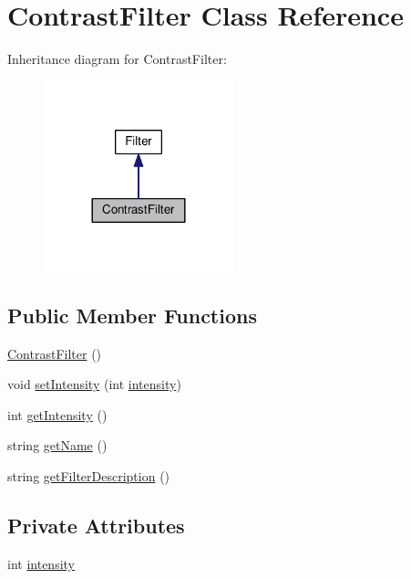 \hypertarget{classModel_1_1ContrastFilter}{}\section{Contrast\+Filter Class Reference}
\label{classModel_1_1ContrastFilter}


Inheritance diagram for Contrast\+Filter\+:
\nopagebreak
\begin{figure}[H]
\begin{center}
\leavevmode
\includegraphics[width=156pt]{classModel_1_1ContrastFilter__inherit__graph}
\end{center}
\end{figure}
\subsection*{Public Member Functions}
\begin{DoxyCompactItemize}
\item 
\hyperlink{classModel_1_1ContrastFilter_abc944002d3dce00b176a4133c05f7c9c}{Contrast\+Filter} ()
\item 
void \hyperlink{classModel_1_1ContrastFilter_ac8255ffbc46bb61acaa8fd23d0d260eb}{set\+Intensity} (int \hyperlink{classModel_1_1ContrastFilter_a299ec0c42ccc5a2d79d1739428ac3210}{intensity})
\item 
int \hyperlink{classModel_1_1ContrastFilter_a708995fb1b6acb31ee0dfb0f4881e5b5}{get\+Intensity} ()
\item 
string \hyperlink{classModel_1_1ContrastFilter_a11335e13e50af74108bf926dc1340b4b}{get\+Name} ()
\item 
string \hyperlink{classModel_1_1ContrastFilter_a62b7b60e24f92234393b840b35808e06}{get\+Filter\+Description} ()
\end{DoxyCompactItemize}
\subsection*{Private Attributes}
\begin{DoxyCompactItemize}
\item 
int \hyperlink{classModel_1_1ContrastFilter_a299ec0c42ccc5a2d79d1739428ac3210}{intensity}
\end{DoxyCompactItemize}
